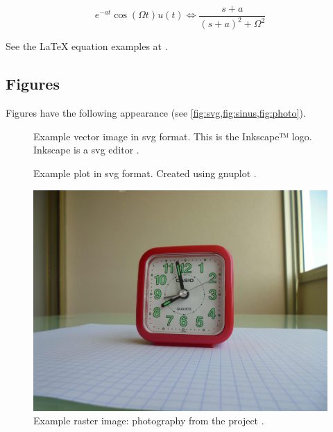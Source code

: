 \begin{equation} \label{eq:example3}
e^{ - at} \cos (\Omega t)u(t) \Leftrightarrow
\frac{{s + a}}{{(s + a)^2  + \Omega ^2 }}
\end{equation}

See the LaTeX equation examples at \cite{equationsheet,SO-latex-equations}.

\subsection{Figures}
Figures have the following appearance (see \cref{fig:svg,fig:sinus,fig:photo}).

\begin{figure}

\caption{\label{fig:svg} Example vector image in svg format. This is the
Inkscape™ logo. Inkscape is a \gls{svg} editor \cite{inkscape}.}
\end{figure}

\begin{figure}

\caption{\label{fig:sinus} Example plot in svg format. Created using gnuplot
\cite{gnuplot}.}
\end{figure}

\begin{figure}
\includegraphics[width=\textwidth]{images/photo-alarm-clock.jpg}
\caption{\label{fig:photo} Example raster image: photography from the
project \cite{thomashoullier/alarm-clock}.}
\end{figure}

